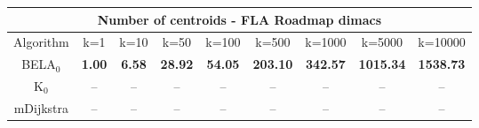 \begin{tabular}{c|cccccccc}\toprule
\multicolumn{9}{c}{Number of centroids - FLA Roadmap dimacs}\\ \midrule
Algorithm & k=1 & k=10 & k=50 & k=100 & k=500 & k=1000 & k=5000 & k=10000 \\ \midrule
BELA$_0$ & \textbf{1.00} & \textbf{6.58} & \textbf{28.92} & \textbf{54.05} & \textbf{203.10} & \textbf{342.57} & \textbf{1015.34} & \textbf{1538.73} \\
K$_0$ & -- & -- & -- & -- & -- & -- & -- & -- \\
mDijkstra & -- & -- & -- & -- & -- & -- & -- & -- \\ \bottomrule 
\end{tabular}
